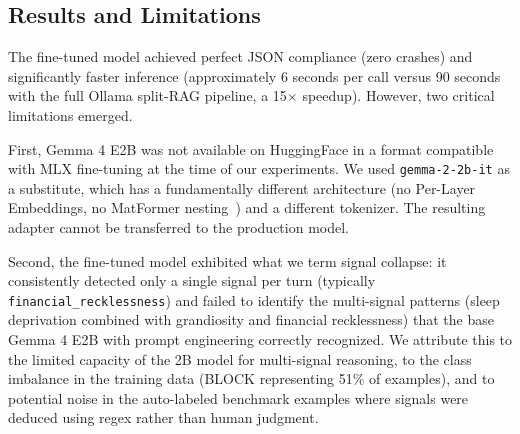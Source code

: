 \documentclass[11pt, a4paper, twocolumn]{article}
\begin{document}
\begin{center}
\label{fig:loss}
\end{center}

\subsection{Results and Limitations}

The fine-tuned model achieved perfect JSON compliance (zero crashes) and significantly faster inference (approximately 6 seconds per call versus 90 seconds with the full Ollama split-RAG pipeline, a 15$\times$ speedup). However, two critical limitations emerged.

First, Gemma 4 E2B was not available on HuggingFace in a format compatible with MLX fine-tuning at the time of our experiments. We used \texttt{gemma-2-2b-it} as a substitute, which has a fundamentally different architecture (no Per-Layer Embeddings, no MatFormer nesting~\cite{gemma2026}) and a different tokenizer. The resulting adapter cannot be transferred to the production model.

Second, the fine-tuned model exhibited what we term signal collapse: it consistently detected only a single signal per turn (typically \texttt{financial\_recklessness}) and failed to identify the multi-signal patterns (sleep deprivation combined with grandiosity and financial recklessness) that the base Gemma 4 E2B with prompt engineering correctly recognized. We attribute this to the limited capacity of the 2B model for multi-signal reasoning, to the class imbalance in the training data (BLOCK representing 51\% of examples), and to potential noise in the auto-labeled benchmark examples where signals were deduced using regex rather than human judgment.
\end{document}
